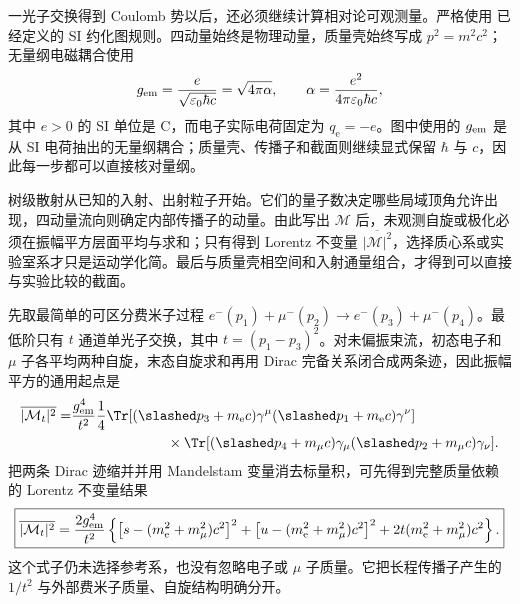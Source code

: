 

一光子交换得到 Coulomb 势以后，还必须继续计算相对论可观测量。严格使用
已经定义的 SI 约化图规则。四动量始终是物理动量，质量壳始终写成 $p^2=m^2c^2$；无量纲电磁耦合使用
\begin{equation}
 g_{\rm em}=\frac{e}{\sqrt{\varepsilon_0\hbar c}}=\sqrt{4\pi\alpha},
 \qquad
 \alpha=\frac{e^2}{4\pi\varepsilon_0\hbar c},
 \label{eq:alpha-si-qed-r10}
\end{equation}
其中 $e>0$ 的 SI 单位是 C，而电子实际电荷固定为 $q_{\mathrm e}=-e$。图中使用的 $g_{\rm em}$ 是从 SI 电荷抽出的无量纲耦合；质量壳、传播子和截面则继续显式保留 $\hbar$ 与 $c$，因此每一步都可以直接核对量纲。

树级散射从已知的入射、出射粒子开始。它们的量子数决定哪些局域顶角允许出现，四动量流向则确定内部传播子的动量。由此写出 $\mathcal M$ 后，未观测自旋或极化必须在振幅平方层面平均与求和；只有得到 Lorentz 不变量 $\overline{|\mathcal M|^2}$，选择质心系或实验室系才只是运动学化简。最后与质量壳相空间和入射通量组合，才得到可以直接与实验比较的截面。

先取最简单的可区分费米子过程
$e^-(p_1)+\mu^-(p_2)\to e^-(p_3)+\mu^-(p_4)$。最低阶只有 $t$ 通道单光子交换，其中 $t=(p_1-p_3)^2$。对未偏振束流，初态电子和 $\mu$ 子各平均两种自旋，末态自旋求和再用 Dirac 完备关系闭合成两条迹，因此振幅平方的通用起点是
\begin{align}
 \overline{|\mathcal M_t|^2}
 =&\frac{g_{\rm em}^4}{t^2}\frac14
 \Tr[(\slashed p_3+m_{\mathrm e} c)\gamma^\mu(\slashed p_1+m_{\mathrm e} c)\gamma^\nu]\nonumber\\
 &\hspace{2.4cm}\times
 \Tr[(\slashed p_4+m_\mu c)\gamma_\mu(\slashed p_2+m_\mu c)\gamma_\nu].
 \label{eq:emu-M2-trace}
\end{align}
把两条 Dirac 迹缩并并用 Mandelstam 变量消去标量积，可先得到完整质量依赖的 Lorentz 不变量结果
\begin{equation}
 \boxed{
 \overline{|\mathcal M_t|^2}
 =\frac{2g_{\rm em}^4}{t^2}
 \left\{
 \left[s-(m_{\mathrm e}^2+m_\mu^2)c^2\right]^2
 +\left[u-(m_{\mathrm e}^2+m_\mu^2)c^2\right]^2
 +2t(m_{\mathrm e}^2+m_\mu^2)c^2
 \right\}.}
 \label{eq:emu-M2-massive-invariants-dp49}
\end{equation}
这个式子仍未选择参考系，也没有忽略电子或 $\mu$ 子质量。它把长程传播子产生的 $1/t^2$ 与外部费米子质量、自旋结构明确分开。

